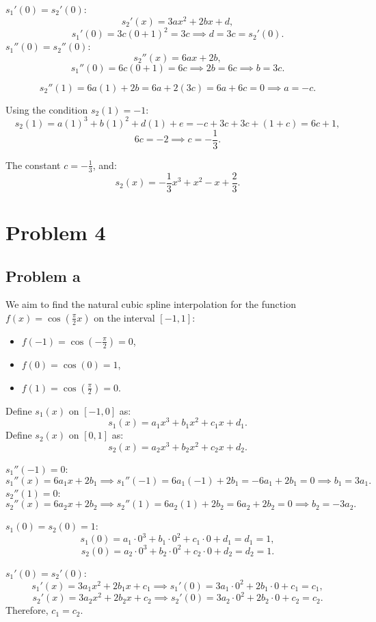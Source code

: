 \documentclass{article}
\begin{document}
\( s_1'(0) = s_2'(0) \):
   \[
   s_2'(x) = 3a x^2 + 2b x + d,
   \]
   \[
   s_1'(0) = 3c (0 + 1)^2 = 3c \implies d = 3c = s_2'(0).
   \]
\( s_1''(0) = s_2''(0) \):
   \[
   s_2''(x) = 6a x + 2b,
   \]
   \[
   s_1''(0) = 6c (0 + 1) = 6c \implies 2b = 6c \implies b = 3c.
   \]

\[
s_2''(1) = 6a (1) + 2b = 6a + 2(3c) = 6a + 6c = 0 \implies a = -c.
\]

Using the condition \( s_2(1) = -1 \):
\[
s_2(1) = a(1)^3 + b(1)^2 + d(1) + e = -c + 3c + 3c + (1 + c) = 6c + 1,
\]
\[
6c = -2 \implies c = -\frac{1}{3}.
\]

The constant \( c = -\frac{1}{3} \), and:
\[
s_2(x) = -\frac{1}{3} x^3 + x^2 - x + \frac{2}{3}.
\]


\section{Problem 4}
\subsection{Problem a}
We aim to find the natural cubic spline interpolation for the function \( f(x) = \cos\left(\frac{\pi}{2} x\right) \) on the interval \([-1, 1]\):
\begin{itemize}
    \item \( f(-1) = \cos\left(-\frac{\pi}{2}\right) = 0 \),
    \item \( f(0) = \cos(0) = 1 \),
    \item \( f(1) = \cos\left(\frac{\pi}{2}\right) = 0 \).
\end{itemize}

Define \( s_1(x) \) on \([-1, 0]\) as:
\[
s_1(x) = a_1 x^3 + b_1 x^2 + c_1 x + d_1.
\]
Define \( s_2(x) \) on \([0, 1]\) as:
\[
s_2(x) = a_2 x^3 + b_2 x^2 + c_2 x + d_2.
\]

\( s_1''(-1) = 0 \):
   \[
   s_1''(x) = 6a_1 x + 2b_1 \implies s_1''(-1) = 6a_1(-1) + 2b_1 = -6a_1 + 2b_1 = 0 \implies b_1 = 3a_1.
   \]
\( s_2''(1) = 0 \):
   \[
   s_2''(x) = 6a_2 x + 2b_2 \implies s_2''(1) = 6a_2(1) + 2b_2 = 6a_2 + 2b_2 = 0 \implies b_2 = -3a_2.
   \]

\( s_1(0) = s_2(0) = 1 \):
   \[
   s_1(0) = a_1 \cdot 0^3 + b_1 \cdot 0^2 + c_1 \cdot 0 + d_1 = d_1 = 1,
   \]
   \[
   s_2(0) = a_2 \cdot 0^3 + b_2 \cdot 0^2 + c_2 \cdot 0 + d_2 = d_2 = 1.
   \]

\( s_1'(0) = s_2'(0) \):
   \[
   s_1'(x) = 3a_1 x^2 + 2b_1 x + c_1 \implies s_1'(0) = 3a_1 \cdot 0^2 + 2b_1 \cdot 0 + c_1 = c_1,
   \]
   \[
   s_2'(x) = 3a_2 x^2 + 2b_2 x + c_2 \implies s_2'(0) = 3a_2 \cdot 0^2 + 2b_2 \cdot 0 + c_2 = c_2.
   \]
   Therefore, \( c_1 = c_2 \).
\end{document}
